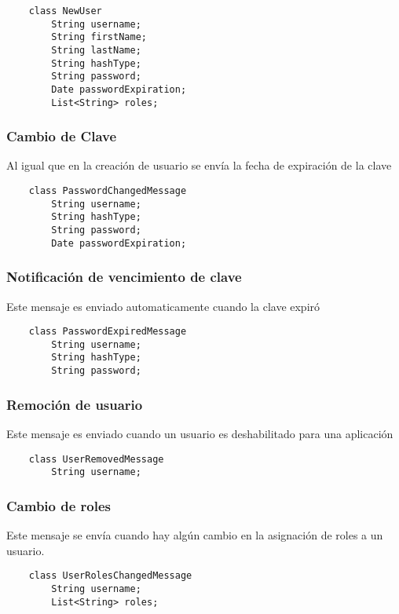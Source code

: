   \begin{verbatim}
    class NewUser
        String username;
        String firstName;
        String lastName;
        String hashType;
        String password;
        Date passwordExpiration;
        List<String> roles;
  \end{verbatim}

\subsubsection{Cambio de Clave}
Al igual que en la creación de usuario se envía la fecha de expiración de la clave 

  \begin{verbatim}
    class PasswordChangedMessage    
        String username;
        String hashType;    
        String password;
        Date passwordExpiration;
  \end{verbatim}

\subsubsection{Notificación de vencimiento de clave}
Este mensaje es enviado automaticamente cuando la clave expiró

  \begin{verbatim}
    class PasswordExpiredMessage
        String username;
        String hashType;    
        String password;
  \end{verbatim}

\subsubsection{Remoción de usuario}
Este mensaje es enviado cuando un usuario es deshabilitado para una aplicación
  \begin{verbatim}
    class UserRemovedMessage
        String username;
  \end{verbatim}
 
\subsubsection{Cambio de roles}
Este mensaje se envía cuando hay algún cambio en la asignación de roles a un usuario.

  \begin{verbatim}
    class UserRolesChangedMessage
        String username;
        List<String> roles;
  \end{verbatim}

